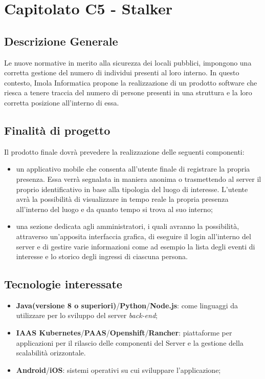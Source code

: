 \section{Capitolato C5 - Stalker}
\subsection{Descrizione Generale}
Le nuove normative in merito alla sicurezza dei locali pubblici, impongono una corretta gestione del numero di individui presenti al loro interno. In questo contesto, Imola Informatica propone la realizzazione di un prodotto software che riesca a tenere traccia del numero di persone presenti in una struttura e la loro corretta posizione all'interno di essa.
\subsection{Finalità di progetto}
Il prodotto finale dovrà prevedere la realizzazione delle seguenti componenti:
\begin{itemize}
	\item un applicativo mobile che consenta all'utente finale di registrare la propria presenza. Essa verrà segnalata in maniera anonima o trasmettendo al server il proprio identificativo in base alla tipologia del luogo di interesse. L'utente avrà la possibilità di visualizzare in tempo reale la propria presenza all'interno del luogo e da quanto tempo si trova al suo interno;
	\item una sezione dedicata agli amministratori, i quali avranno la possibilità, attraverso un'apposita interfaccia grafica, di eseguire il login all'interno del server e di gestire varie informazioni come ad esempio la lista degli eventi di interesse e lo storico degli ingressi di ciascuna persona.
\end{itemize}
\subsection{Tecnologie interessate}
\begin{itemize}
	\item \textbf{Java(versione 8 o superiori)}/\textbf{Python}/\textbf{Node.js}: come linguaggi da utilizzare per lo sviluppo del server \textit{back-end\glos};
	\item \textbf{IAAS Kubernetes\glos}/\textbf{PAAS\glos}/\textbf{Openshift\glos}/\textbf{Rancher\glos}: piattaforme per applicazioni per il rilascio delle componenti del Server e la gestione della scalabilità orizzontale.
	\item \textbf{Android}/\textbf{iOS}: sistemi operativi su cui sviluppare l'applicazione;
\end{itemize}


